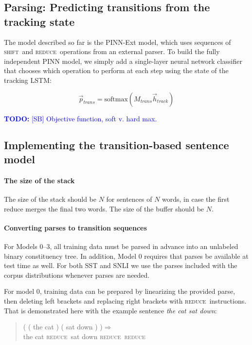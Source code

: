 \documentclass[11pt,letterpaper]{article}
\newcommand\todo[1]{\textcolor{blue}{\textbf{TODO:} #1}}
\newcommand{\shift}{\textsc{shift}}
\newcommand{\reduce}{\textsc{reduce}}
\def\ii#1{\textit{#1}}
\begin{document}
\subsection{Parsing: Predicting transitions from the tracking state}

The model described so far is the PINN-Ext model, which uses sequences of \shift~and \reduce~operations from an external parser. To build the fully independent PINN model, we simply add a single-layer neural network classifier that chooses which operation to perform at each step using the state of the tracking LSTM:

\begin{equation}
\vec{p}_{trans} = \text{softmax}(M_{trans}\vec{h}_{track})
\end{equation}

\todo{[SB] Objective function, soft v. hard max.} 

\subsection{Implementing the transition-based sentence model}

\paragraph{The size of the stack}
The size of the stack should be $N$ for sentences of $N$ words, in case the first reduce merges the final two words. The size of the buffer should be $N$.

\paragraph{Converting parses to transition sequences}

For Models 0--3, all training data must be parsed in advance into an unlabeled binary constituency tree. In addition, Model 0 requires that  parses be available at test time as well. For both SST and SNLI we use the parses included with the corpus distributions whenever parses are needed. 

For model 0, training data can be prepared by linearizing the provided parse, then deleting left brackets and replacing right brackets with \reduce~instructions. That is demonstrated here with the example sentence \ii{the cat sat down}:

\begin{quote}\small
( ( the cat ) ( sat down ) )$\Rightarrow$\\
the cat \reduce~sat down \reduce~\reduce
\end{quote}
\end{document}
